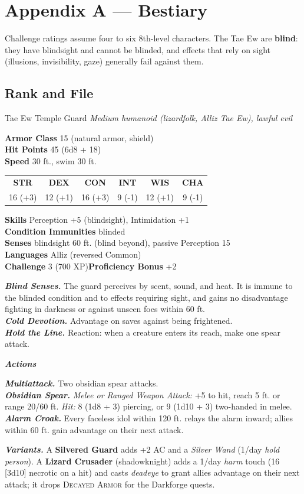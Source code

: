 \documentclass[10pt,twoside]{article}
\newcommand{\abilities}[6]{%
\begin{center}\small
\setlength{\tabcolsep}{6pt}\renewcommand{\arraystretch}{1.05}
\begin{tabular}{cccccc}
\textbf{STR}&\textbf{DEX}&\textbf{CON}&\textbf{INT}&\textbf{WIS}&\textbf{CHA}\\[1pt]
#1&#2&#3&#4&#5&#6\\
\end{tabular}\end{center}}
\newcommand{\sbrule}{\par\vspace{2pt}\noindent{\color{bloodred}\rule{\linewidth}{1.1pt}}\par\vspace{2pt}}
\newcommand{\eqname}[1]{\textsc{#1}}
\begin{document}
\clearpage
\section{Appendix A --- Bestiary}

Challenge ratings assume four to six 8th-level characters. The Tae Ew are
\textbf{blind}: they have blindsight and cannot be blinded, and effects that rely on
sight (illusions, invisibility, gaze) generally fail against them.

\subsection*{Rank and File}

\begin{statblock}{Tae Ew Temple Guard}
\textit{Medium humanoid (lizardfolk, Alliz Tae Ew), lawful evil}\sbrule
\textbf{Armor Class} 15 (natural armor, shield)\\
\textbf{Hit Points} 45 (6d8 + 18)\\
\textbf{Speed} 30 ft., swim 30 ft.\sbrule
\abilities{16 (+3)}{12 (+1)}{16 (+3)}{9 (-1)}{12 (+1)}{9 (-1)}
\sbrule
\textbf{Skills} Perception +5 (blindsight), Intimidation +1\\
\textbf{Condition Immunities} blinded\\
\textbf{Senses} blindsight 60 ft. (blind beyond), passive Perception 15\\
\textbf{Languages} Alliz (reversed Common)\\
\textbf{Challenge} 3 (700 XP)\hfill\textbf{Proficiency Bonus} +2\sbrule
\textbf{\textit{Blind Senses.}} The guard perceives by scent, sound, and heat. It is
immune to the blinded condition and to effects requiring sight, and gains no
disadvantage fighting in darkness or against unseen foes within 60 ft.\\
\textbf{\textit{Cold Devotion.}} Advantage on saves against being frightened.\\
\textbf{\textit{Hold the Line.}} Reaction: when a creature enters its reach, make one
spear attack.\sbrule
\textit{\textbf{Actions}}\par
\textbf{\textit{Multiattack.}} Two obsidian spear attacks.\\
\textbf{\textit{Obsidian Spear.}} \textit{Melee or Ranged Weapon Attack:} +5 to hit,
reach 5 ft. or range 20/60 ft. \textit{Hit:} 8 (1d8 + 3) piercing, or 9 (1d10 + 3)
two-handed in melee.\\
\textbf{\textit{Alarm Croak.}} Every faceless idol within 120 ft. relays the alarm
inward; allies within 60 ft. gain advantage on their next attack.\sbrule
\textbf{\textit{Variants.}} A \textbf{Silvered Guard} adds +2 AC and a \textit{Silver
Wand} (1/day \textit{hold person}). A \textbf{Lizard Crusader} (shadowknight) adds a
1/day \textit{harm} touch (16 [3d10] necrotic on a hit) and casts \textit{deadeye} to
grant allies advantage on their next attack; it drops \eqname{Decayed Armor} for the
Darkforge quests.
\end{statblock}
\end{document}
